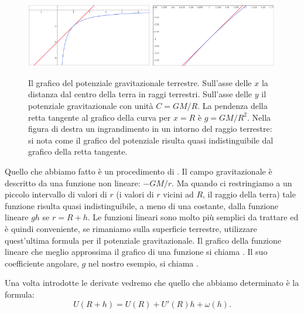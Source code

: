 \begin{figure}
\includegraphics[width=0.49\textwidth]{derivata_00.png}\hfill%
\includegraphics[width=0.49\textwidth]{derivata_01.png}
\label{fig:derivata}
\caption{Il grafico del potenziale gravitazionale terrestre.
Sull'asse delle $x$ la distanza dal centro della terra in raggi terrestri.
Sull'asse delle $y$ il potenziale gravitazionale con unità $C=GM/R$.
La pendenza della retta tangente al grafico della curva per $x=R$ è $g=GM/R^2$.
Nella figura di destra un ingrandimento in un intorno del raggio terrestre:
si nota come il grafico del potenziale risulta quasi indistinguibile dal
grafico della retta tangente.}
\end{figure}

Quello che abbiamo fatto è un procedimento di . Il campo gravitazionale è descritto da una funzione non lineare: $-GM/r$.
Ma quando ci restringiamo a un piccolo intervallo di valori di $r$ (i valori di $r$ vicini ad $R$, il raggio della terra) tale funzione risulta quasi indistinguibile, a meno di una costante, dalla funzione lineare $gh$ se $r=R+h$.
Le funzioni lineari sono molto più semplici da trattare ed è quindi conveniente, se rimaniamo sulla superficie terrestre, utilizzare quest'ultima formula per il potenziale gravitazionale.
Il grafico della funzione lineare che meglio approssima il grafico di una funzione si chiama . Il suo coefficiente angolare, $g$ nel nostro esempio, si chiama .

Una volta introdotte le derivate vedremo che quello che abbiamo
determinato è la formula:
\[
U(R+h) = U(R) + U'(R) h + \omega(h).
\]

